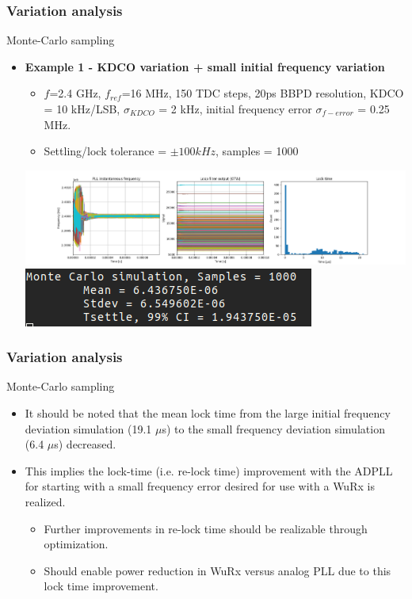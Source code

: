 \documentclass[t, screen, aspectratio=43]{beamer}
\begin{document}
\begin{frame}
	\frametitle{Variation analysis}
	\begin{block}{Monte-Carlo sampling }
		\begin{itemize}
		\scriptsize
		\item \textbf{Example 1 - KDCO variation + small initial frequency variation }
		\begin{itemize}
			\scriptsize
			\item $f$=2.4 GHz, $f_{ref}$=16 MHz, 150 TDC steps, 20ps BBPD resolution, KDCO = 10 kHz/LSB, $\sigma_{KDCO}$ = 2 kHz, initial frequency error  $\sigma_{f-error}$ = 0.25 MHz.
			\item Settling/lock tolerance = $\pm 100 kHz$, samples = 1000
		\end{itemize}
		\center\includegraphics[width=1.0\linewidth]{kdco_small_df_f_init_mc_hist.png}
		\center\includegraphics[width=0.4\linewidth]{mc_small_df.png}

		\end{itemize}    
	\end{block}
\end{frame}

\begin{frame}
	\frametitle{Variation analysis}
	\begin{block}{Monte-Carlo sampling }
		\begin{itemize}
		\scriptsize
		\item It should be noted that the mean lock time from the large initial frequency deviation simulation (19.1 $\mu$s) to the small frequency deviation simulation (6.4 $\mu$s) decreased.
		\item This implies the lock-time (i.e. re-lock time) improvement with the ADPLL for starting with a small frequency error desired for use with a WuRx is realized.
		\begin{itemize}
			\scriptsize
			\item Further improvements in re-lock time should be realizable through optimization.
			\item Should enable power reduction in WuRx versus analog PLL due to this lock time improvement.
		\end{itemize}
		\end{itemize}    
	\end{block}
\end{frame}
\end{document}
